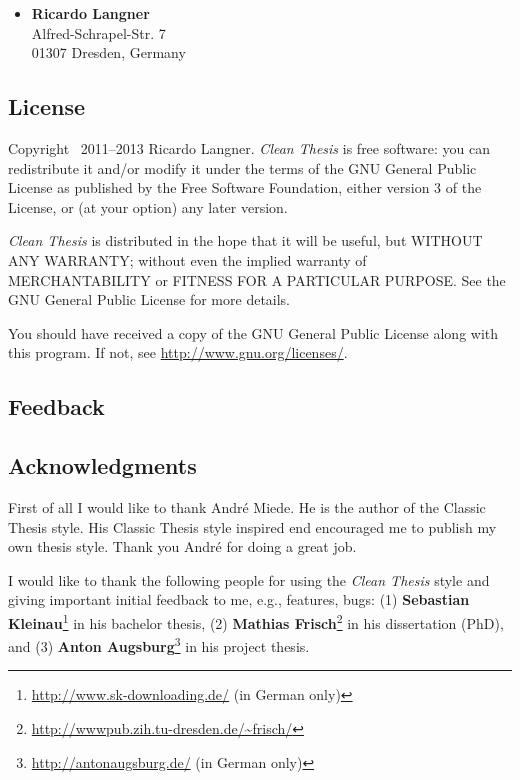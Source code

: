 \documentclass{ltxdockit}
\newcommand*{\cleanthesis}{\emph{Clean Thesis}\xspace}
\begin{document}
\begin{itemize}
\item \textbf{Ricardo Langner} \\
Alfred-Schrapel-Str. 7 \\
01307 Dresden, Germany
\end{itemize}

\subsection{License}
\label{sec:intro:license}

Copyright \textcopyright\ 2011--2013 Ricardo Langner.
\cleanthesis is free software: you can redistribute it and/or modify it under the terms of the GNU General Public License as published by the Free Software Foundation, either version 3 of the License, or (at your option) any later version.

\cleanthesis is distributed in the hope that it will be useful, but WITHOUT ANY WARRANTY; without even the implied warranty of MERCHANTABILITY or FITNESS FOR A PARTICULAR PURPOSE.
See the GNU General Public License for more details.

You should have received a copy of the GNU General Public License along with this program.
If not, see \url{http://www.gnu.org/licenses/}.

\subsection{Feedback}
\label{sec:intro:feedback}

\subsection{Acknowledgments}
\label{sec:intro:ack}

First of all I would like to thank André Miede. He is the author of the Classic Thesis style. His Classic Thesis style inspired end encouraged me to publish my own thesis style. Thank you André for doing a great job.

I would like to thank the following people for using the \cleanthesis style and giving important initial feedback to me, e.g., features, bugs: (1) \textbf{Sebastian Kleinau}\footnote{\url{http://www.sk-downloading.de/} (in German only)} in his bachelor thesis, (2) \textbf{Mathias Frisch}\footnote{\url{http://wwwpub.zih.tu-dresden.de/~frisch/}} in his dissertation (PhD), and (3) \textbf{Anton Augsburg}\footnote{\url{http://antonaugsburg.de/} (in German only)} in his project thesis.
\end{document}
